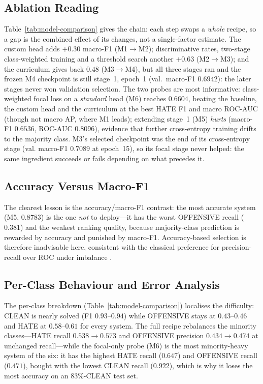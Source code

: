 

\subsection{Ablation Reading}
Table~\ref{tab:model-comparison} gives the chain: each step swaps a \emph{whole}
recipe, so a gap is the combined effect of its changes, not a single-factor
estimate.  The custom head adds $+0.30$ macro-F1 (M1$\to$M2); discriminative rates,
two-stage class-weighted training and a threshold search another $+0.63$
(M2$\to$M3); and the curriculum gives back $0.48$ (M3$\to$M4), but all three
stages ran and the frozen M4 checkpoint is still stage~1, epoch~1 (val.\ macro-F1
$0.6942$): the later stages never won validation selection.  The two probes are
most informative: class-weighted focal loss on a \emph{standard} head (M6) reaches
$0.6604$, beating the baseline, the custom head and the curriculum at the best HATE
F1 and macro ROC-AUC (though not macro AP, where M1 leads); extending stage~1 (M5)
\emph{hurts} (macro-F1 $0.6536$,
ROC-AUC $0.8096$), evidence that further cross-entropy training drifts to the
majority class.  M3's selected checkpoint was the end of its cross-entropy stage
(val. macro-F1 $0.7089$ at epoch~15), so its focal stage never helped: the same
ingredient succeeds or fails depending on what precedes it.

\subsection{Accuracy Versus Macro-F1}
\label{sec:trap}
The clearest lesson is the accuracy/macro-F1 contrast: the most accurate system
(M5, $0.8783$) is the one \emph{not} to deploy---it has the worst OFFENSIVE
recall ($0.381$) and the weakest ranking quality, because majority-class
prediction is rewarded by accuracy and punished by macro-F1.  Accuracy-based
selection is therefore inadvisable here, consistent with the classical preference
for precision-recall over ROC under imbalance \cite{saito2015precision}.

\subsection{Per-Class Behaviour and Error Analysis}
The per-class breakdown (Table~\ref{tab:model-comparison}) localises the
difficulty: CLEAN is nearly solved (F1 $0.93$--$0.94$) while OFFENSIVE stays at
$0.43$--$0.46$ and HATE at $0.58$--$0.61$ for every system.  The full recipe
rebalances the minority classes---HATE recall $0.538\to0.573$ and OFFENSIVE
precision $0.434\to0.474$ at unchanged recall---while the focal-only probe (M6) is
the most minority-heavy system of the six: it has the highest HATE recall
($0.647$) and OFFENSIVE recall ($0.471$), bought with the lowest CLEAN recall
($0.922$), which is why it loses the most accuracy on an 83\%-CLEAN test set.

